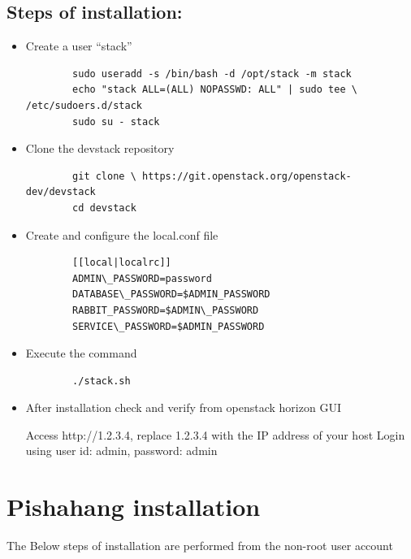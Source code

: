 	\subsection{Steps of installation:}
	\begin{itemize}
		\item Create a user “stack”
		\begin{lstlisting}
		sudo useradd -s /bin/bash -d /opt/stack -m stack
		echo "stack ALL=(ALL) NOPASSWD: ALL" | sudo tee \ /etc/sudoers.d/stack
		sudo su - stack
		\end{lstlisting}
		
		\item Clone the devstack repository
		\begin{lstlisting}
		git clone \ https://git.openstack.org/openstack-dev/devstack
		cd devstack
		\end{lstlisting}
		\newpage
		\item Create and configure the local.conf file\\
		\begin{lstlisting}
		[[local|localrc]]
		ADMIN\_PASSWORD=password
		DATABASE\_PASSWORD=$ADMIN_PASSWORD
		RABBIT_PASSWORD=$ADMIN\_PASSWORD
		SERVICE\_PASSWORD=$ADMIN_PASSWORD 	
		\end{lstlisting}
		
		
		\item Execute the command
		\begin{lstlisting}
		./stack.sh
		\end{lstlisting}
		
		\item After installation check and verify from openstack horizon GUI
		
		Access http://1.2.3.4, replace 1.2.3.4 with the IP address of your host
		Login using user id: admin, password: admin
	\end{itemize}
	
	\section{Pishahang installation}
	\label{sec:Pishahang installation}
	The Below steps of installation are performed from the non-root user account
	
